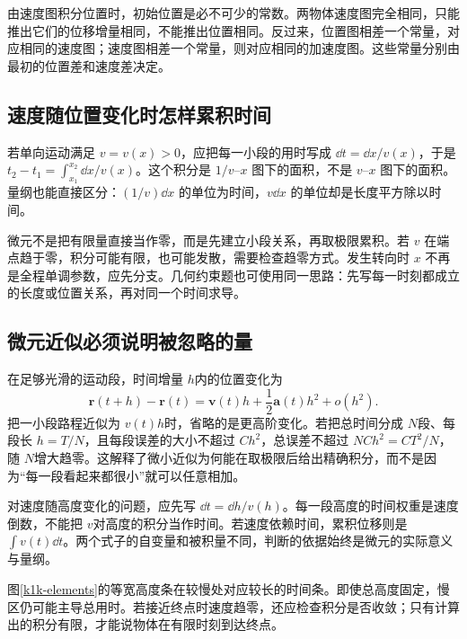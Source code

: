 由速度图积分位置时，初始位置是必不可少的常数。两物体速度图完全相同，只能推出它们的位移增量相同，不能推出位置相同。反过来，位置图相差一个常量，对应相同的速度图；速度图相差一个常量，则对应相同的加速度图。这些常量分别由最初的位置差和速度差决定。



\subsection{速度随位置变化时怎样累积时间}
若单向运动满足 $v=v(x)>0$，应把每一小段的用时写成 $\dd t=\dd x/v(x)$，于是 $t_2-t_1=\int_{x_1}^{x_2}\dd x/v(x)$。这个积分是 $1/v$--$x$ 图下的面积，不是 $v$--$x$ 图下的面积。量纲也能直接区分：$(1/v)\dd x$ 的单位为时间，$v\dd x$ 的单位却是长度平方除以时间。

微元不是把有限量直接当作零，而是先建立小段关系，再取极限累积。若 $v$ 在端点趋于零，积分可能有限，也可能发散，需要检查趋零方式。发生转向时 $x$ 不再是全程单调参数，应先分支。几何约束题也可使用同一思路：先写每一时刻都成立的长度或位置关系，再对同一个时间求导。



\subsection{微元近似必须说明被忽略的量}
在足够光滑的运动段，时间增量 $h$内的位置变化为
\[\bm r(t+h)-\bm r(t)=\bm v(t)h+\frac12\bm a(t)h^2+o(h^2).\]
把一小段路程近似为 $v(t)h$时，省略的是更高阶变化。若把总时间分成 $N$段、每段长 $h=T/N$，且每段误差的大小不超过 $Ch^2$，总误差不超过 $NCh^2=CT^2/N$，随 $N$增大趋零。这解释了微小近似为何能在取极限后给出精确积分，而不是因为“每一段看起来都很小”就可以任意相加。

对速度随高度变化的问题，应先写 $\dd t=\dd h/v(h)$。每一段高度的时间权重是速度倒数，不能把 $v$对高度的积分当作时间。若速度依赖时间，累积位移则是 $\int v(t)\dd t$。两个式子的自变量和被积量不同，判断的依据始终是微元的实际意义与量纲。

图\ref{k1k-elements}的等宽高度条在较慢处对应较长的时间条。即使总高度固定，慢区仍可能主导总用时。若接近终点时速度趋零，还应检查积分是否收敛；只有计算出的积分有限，才能说物体在有限时刻到达终点。



